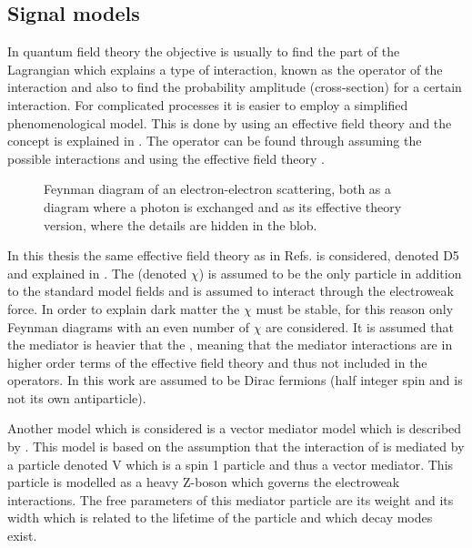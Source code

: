 \subsection{Signal models}\label{sec:tb:subsec:eft}
In quantum field theory the objective is usually to find the part of the Lagrangian which explains a type of interaction, known as the operator of the interaction and also to find the probability amplitude (cross-section) for a certain interaction. For complicated processes it is easier to employ a simplified phenomenological model. This is done by using an effective field theory and the concept is explained in . The operator can be found through assuming the possible interactions and using the effective field theory \citep{Zee:2003}. 
 \begin{figure}[H] %
    \hfill
    \caption{Feynman diagram of an electron-electron scattering, both as a diagram where a photon is exchanged and as its effective theory version, where the details are hidden in the blob.}
    \label{fig:feymanc}
  \end{figure}
In this thesis the same effective field theory as in Refs. \citep{82.116010,Goodman:2010} is considered, denoted D5 and explained in . The \abbrWIMP (denoted $\chi$) is assumed to be the only particle in addition to the standard model fields and is assumed to interact through the electroweak force. In order to explain dark matter the \abbrWIMP $\chi$ must be stable, for this reason only Feynman diagrams with an even number of $\chi$ are considered. It is assumed that the mediator is heavier that the \abbrWIMPS, meaning that the mediator interactions are in higher order terms of the effective field theory and thus not included in the operators. In this work \abbrWIMPS are assumed to be Dirac fermions (half integer spin and is not its own antiparticle). 

Another model which is considered is a vector mediator model which is described by . This model is based on the assumption that the interaction of \abbrWIMPS is mediated by a particle denoted V which is a spin 1 particle and thus a vector mediator. This particle is modelled as a heavy Z-boson which governs the electroweak interactions. The free parameters of this mediator particle are its weight and its width which is related to the lifetime of the particle and which decay modes exist. 


